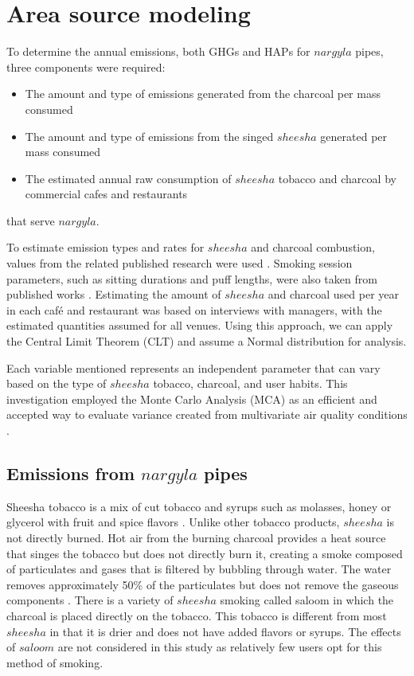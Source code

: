 \section{Area source modeling}
To determine the annual emissions, both GHGs and HAPs for $nargyla$ pipes, three components were required: 
\begin{itemize}
	\item The amount and type of emissions generated from the charcoal per mass consumed
	\item The amount and type of emissions from the singed $sheesha$ generated per mass consumed
	\item The estimated annual raw consumption of $sheesha$ tobacco and charcoal by commercial cafes and restaurants 
\end{itemize}
\noindent
that serve $nargyla$. 

To estimate emission types and rates for $sheesha$ and charcoal combustion, values from the related published research were used \citep{Akagi2011, Bhattacharya2002, Paciornik2006, Sepetdjian2010, USEPA1995}.  Smoking session parameters, such as sitting durations and puff lengths, were also taken from published works \citep{Eissenberg2009, Fromme2009, Mulla2015}.  Estimating the amount of $sheesha$ and charcoal used per year in each café and restaurant was based on interviews with managers, with the estimated quantities assumed for all venues. Using this approach, we can apply the Central Limit Theorem (CLT) and assume a Normal distribution for analysis.  

Each variable mentioned represents an independent parameter that can vary based on the type of $sheesha$ tobacco, charcoal, and user habits.  This investigation employed the Monte Carlo Analysis (MCA) as an efficient and accepted way to evaluate variance created from multivariate air quality conditions \citep{Freeman2017a, McVoy1979, Tan2014}.  

\subsection{Emissions from $nargyla$ pipes}

Sheesha tobacco is a mix of cut tobacco and syrups such as molasses, honey or glycerol with fruit and spice flavors \citep{Chaouachi2009}.  Unlike other tobacco products, $sheesha$ is not directly burned. Hot air from the burning charcoal provides a heat source that singes the tobacco but does not directly burn it, creating a smoke composed of particulates and gases \citep{Daher2010} that is filtered by bubbling through water.  The water removes approximately 50\% of the particulates but does not remove the gaseous components \citep{Becquemin2008}. There is a variety of $sheesha$ smoking called saloom in which the charcoal is placed directly on the tobacco. This tobacco is different from most $sheesha$ in that it is drier and does not have added flavors or syrups. The effects of $saloom$ are not considered in this study as relatively few users opt for this method of smoking.

